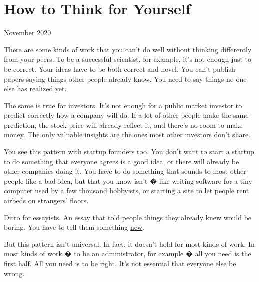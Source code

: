 \chapter{How to Think for Yourself}


            
              
                

November 2020

There are some kinds of work that
                  you can't do well without thinking differently from your
                  peers. To be a successful scientist, for example, it's not
                  enough just to be correct. Your ideas have to be both correct
                  and novel. You can't publish papers saying things other people
                  already know. You need to say things no one else has realized
                  yet.

The same is true for investors. It's not
                  enough for a public market investor to predict correctly how a
                  company will do. If a lot of other people make the same
                  prediction, the stock price will already reflect it, and
                  there's no room to make money. The only valuable insights are
                  the ones most other investors don't share.

You see
                  this pattern with startup founders too. You don't want to
                  start a startup to do something that everyone agrees is a good
                  idea, or there will already be other companies doing it. You
                  have to do something that sounds to most other people like a
                  bad idea, but that you know isn't � like writing software for
                  a tiny computer used by a few thousand hobbyists, or starting
                  a site to let people rent airbeds on strangers' floors.

Ditto
                  for essayists. An essay that told people things they already
                  knew would be boring. You have to tell them something
                  \href{http://www.paulgraham.com/useful.html}{\underline{new}}.

But this pattern isn't universal. In fact, it
                  doesn't hold for most kinds of work. In most kinds of work �
                  to be an administrator, for example � all you need is the
                  first half. All you need is to be right. It's not essential
                  that everyone else be wrong.

